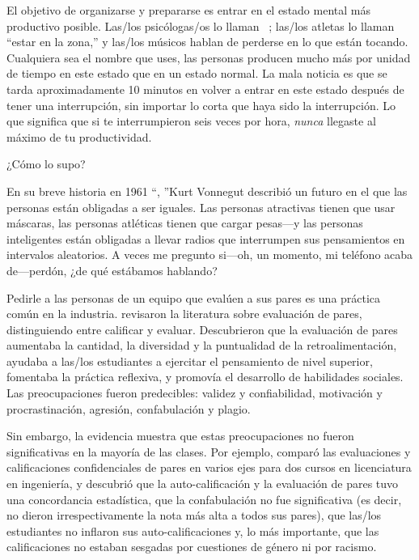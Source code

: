 El objetivo de organizarse y prepararse es
entrar en el estado mental más productivo posible.
Las/los psicólogas/os lo llaman ~\cite{Csik2008};
las/los atletas lo llaman ``estar en la zona,''
y las/los músicos hablan de perderse en lo que están tocando.
Cualquiera sea el nombre que uses,
las personas producen mucho más por unidad de tiempo en este estado que en un estado normal.
La mala noticia es que
se tarda aproximadamente 10 minutos en volver a entrar en este estado después de tener una interrupción,
sin importar lo corta que haya sido la interrupción.
Lo que significa que si te interrumpieron seis veces por hora,
\emph{nunca} llegaste al máximo de tu productividad.


\begin{aside}{¿Cómo lo supo?}

  En su breve historia en 1961 ``, ''Kurt Vonnegut describió un futuro en el que las personas están obligadas a ser iguales.
  Las personas atractivas tienen que usar máscaras,
  las personas atléticas tienen que cargar pesas---y las personas inteligentes
  están obligadas a llevar radios que interrumpen sus pensamientos en intervalos aleatorios.
  A veces me pregunto si---oh, un momento, mi teléfono acaba de---perdón, ¿de qué estábamos hablando?

\end{aside}


Pedirle a las personas de un equipo que evalúen a sus pares es una práctica común en la industria.
\cite{Sond2012} revisaron la literatura sobre evaluación de pares,
distinguiendo entre calificar y evaluar.
Descubrieron que la evaluación de pares aumentaba la cantidad, la diversidad y la puntualidad de la retroalimentación,
ayudaba a las/los estudiantes a ejercitar el pensamiento de nivel superior,
fomentaba la práctica reflexiva,
y promovía el desarrollo de habilidades sociales.
Las preocupaciones fueron predecibles:
validez y confiabilidad,
motivación y procrastinación,
agresión, confabulación y plagio.

Sin embargo,
la evidencia muestra que estas preocupaciones no fueron significativas en la mayoría de las clases.
Por ejemplo,
\cite{Kauf2000} comparó las evaluaciones y calificaciones confidenciales de pares en varios ejes
para dos cursos en licenciatura en ingeniería,
y descubrió que la auto-calificación y la evaluación de pares tuvo una concordancia estadística,
que la confabulación no fue significativa (es decir, no dieron irrespectivamente la nota más alta a todos sus pares),
que las/los estudiantes no inflaron sus auto-calificaciones
y, lo más importante,
que las calificaciones no estaban sesgadas por cuestiones de género ni por racismo.

